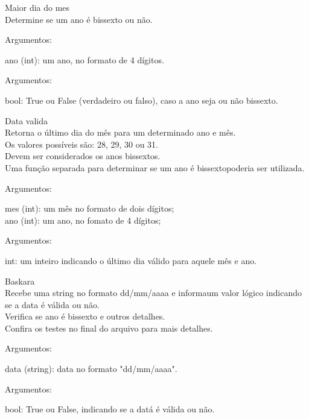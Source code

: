 \documentclass[12pt , a4paper]{article}
\begin{document}
\problem Maior dia do mes\\ 
Determine se um ano é bissexto ou não.
\begin{adjustwidth}{1cm}{}
Argumentos:
\begin{adjustwidth}{1cm}{}ano (int): um ano, no formato de 4 dígitos.
\end{adjustwidth}
Argumentos:
\begin{adjustwidth}{1cm}{}bool: True ou False (verdadeiro ou falso), caso a ano seja ou não bissexto.
\end{adjustwidth}
\end{adjustwidth}

\problem Data valida\\ 
Retorna o último dia do mês para um determinado ano e mês.\\
Os valores possíveis são: 28, 29, 30 ou 31.\\
Devem ser considerados os anos bissextos.\\
Uma função separada para determinar se um ano é bissextopoderia ser utilizada.
\begin{adjustwidth}{1cm}{}
Argumentos:
\begin{adjustwidth}{1cm}{}mes (int): um mês no formato de dois dígitos;\\
ano (int): um ano, no fomato de 4 dígitos;
\end{adjustwidth}
Argumentos:
\begin{adjustwidth}{1cm}{}int: um inteiro indicando o último dia válido para aquele mês e ano.
\end{adjustwidth}
\end{adjustwidth}

\problem Baskara\\ 
Recebe uma string no formato dd/mm/aaaa e informaum valor lógico indicando se a data é válida ou não.\\
Verifica se ano é bissexto e outros detalhes.\\
Confira os testes no final do arquivo para mais detalhes.
\begin{adjustwidth}{1cm}{}
Argumentos:
\begin{adjustwidth}{1cm}{}data (string): data no formato "dd/mm/aaaa".
\end{adjustwidth}
Argumentos:
\begin{adjustwidth}{1cm}{}bool: True ou False, indicando se a datá é válida ou não.
\end{adjustwidth}
\end{adjustwidth}
\end{document}
